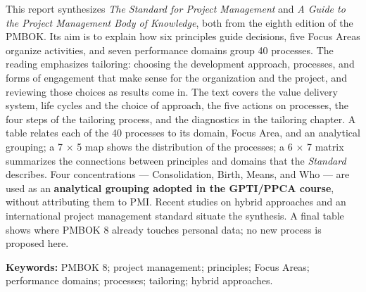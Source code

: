 \documentclass[12pt,a4paper,article,oneside,brazil,english]{abntex2}
\begin{document}
\begin{resumo}[Abstract]
This report synthesizes \textit{The Standard for Project Management} and \textit{A Guide to the Project Management Body of Knowledge}, both from the eighth edition of the PMBOK. Its aim is to explain how six principles guide decisions, five Focus Areas organize activities, and seven performance domains group 40 processes. The reading emphasizes tailoring: choosing the development approach, processes, and forms of engagement that make sense for the organization and the project, and reviewing those choices as results come in. The text covers the value delivery system, life cycles and the choice of approach, the five actions on processes, the four steps of the tailoring process, and the diagnostics in the tailoring chapter. A table relates each of the 40 processes to its domain, Focus Area, and an analytical grouping; a 7 \ensuremath{\times} 5 map shows the distribution of the processes; a 6 \ensuremath{\times} 7 matrix summarizes the connections between principles and domains that the \textit{Standard} describes. Four concentrations — Consolidation, Birth, Means, and Who — are used as an \textbf{analytical grouping adopted in the GPTI/PPCA course}, without attributing them to PMI. Recent studies on hybrid approaches and an international project management standard situate the synthesis. A final table shows where PMBOK 8 already touches personal data; no new process is proposed here.

\vspace{\onelineskip}
\noindent\textbf{Keywords:} PMBOK 8; project management; principles; Focus Areas; performance domains; processes; tailoring; hybrid approaches.
\end{resumo}

\clearpage
\end{document}
